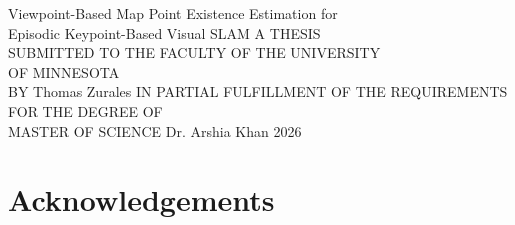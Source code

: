 \documentclass[12pt]{article}
\begin{document}
\doublespace

\begin{titlepage}
    \centering
    \vfill
    Viewpoint-Based Map Point Existence Estimation for\\
    Episodic Keypoint-Based Visual SLAM
    \vfill
    A THESIS\\
    SUBMITTED TO THE FACULTY OF THE UNIVERSITY\\
    OF MINNESOTA\\
    BY
    \vfill
    Thomas Zurales
    \vfill
    IN PARTIAL FULFILLMENT OF THE REQUIREMENTS\\
    FOR THE DEGREE OF\\
    MASTER OF SCIENCE
    \vfill
    Dr. Arshia Khan
    \vfill
    2026
    \vfill
\end{titlepage}


\begin{abstract}
    Keypoint-Based Visual SLAM algorithms perform well over short durations or in unchanging environments, but struggle with increasing map size and outdated map points when environments change. Methods exist to improve performance in dynamic environments over large time scales by removing old or inconsistent data from generated maps. However, no existing method integrates both geometric consistency and historic observability to identify outdated map data. This thesis presents a novel viewpoint-aware probabilistic method for map point culling in keypoint-based visual SLAM systems. The system generates and maintains a model of each map point's global observability, allowing the likelihood of observing a map point to be estimated from arbitrary locations. These model values are combined with new observations of the map point using Bayesian methods to estimate the probability of the map point's continued existence. The implementation is released as an open-source library along with an ORB-SLAM3 integration utilizing the library for point culling and RANSAC improvement. Additionally, a set of stereo visual datasets are provided, containing scenarios specifically intended to exercise and characterize the performance of the system. Effects on standard non-dynamic SLAM datasets are discussed alongside the effects on the dynamic datasets.
\end{abstract}
\clearpage

\section*{Acknowledgements}
\clearpage
\end{document}
